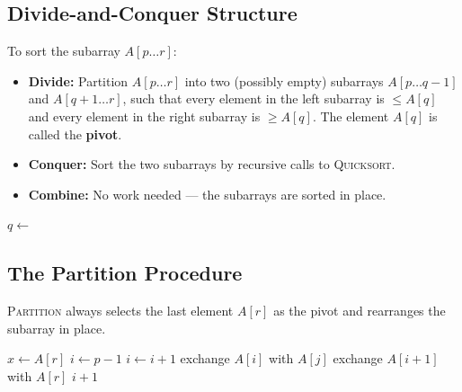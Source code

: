 \subsection{Divide-and-Conquer Structure}

To sort the subarray $A[p \ldots r]$:

\begin{itemize}[noitemsep]
  \item \textbf{Divide:} Partition $A[p \ldots r]$ into two (possibly empty) subarrays
        $A[p \ldots q-1]$ and $A[q+1 \ldots r]$, such that every element in the left subarray
        is $\le A[q]$ and every element in the right subarray is $\ge A[q]$. The element
        $A[q]$ is called the \textbf{pivot}.
  \item \textbf{Conquer:} Sort the two subarrays by recursive calls to \textsc{Quicksort}.
  \item \textbf{Combine:} No work needed — the subarrays are sorted in place.
\end{itemize}

\begin{algorithm}[H]
\caption{Quick Sort}
\begin{algorithmic}[1]
    \State $q \gets$ 
    \State {}
    \State {}
  \EndIf
\EndProcedure
\end{algorithmic}
\end{algorithm}

\subsection{The Partition Procedure}

\textsc{Partition} always selects the last element $A[r]$ as the pivot and rearranges the
subarray in place.

\begin{algorithm}[H]
\caption{Partition}
\begin{algorithmic}[1]
  \State $x \gets A[r]$ 
  \State $i \gets p - 1$
      \State $i \gets i + 1$
      \State exchange $A[i]$ with $A[j]$
    \EndIf
  \EndFor
  \State exchange $A[i+1]$ with $A[r]$ 
  \State \Return $i + 1$
\EndProcedure
\end{algorithmic}
\end{algorithm}

